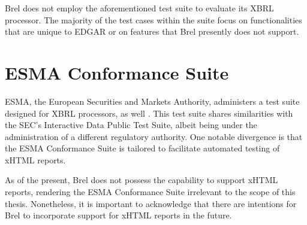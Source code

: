 Brel does not employ the aforementioned test suite to evaluate its XBRL processor.
The majority of the test cases within the suite focus on functionalities that are unique to EDGAR or on features that Brel presently does not support.

\section{ESMA Conformance Suite}

ESMA, the European Securities and Markets Authority, 
administers a test suite designed for XBRL processors, as well \cite{esma_conformance_suite}. 
This test suite shares similarities with the SEC's Interactive Data Public Test Suite, albeit being under the administration of a different regulatory authority. 
One notable divergence is that the ESMA Conformance Suite is tailored to facilitate automated testing of xHTML reports.

As of the present, Brel does not possess the capability to support xHTML reports, 
rendering the ESMA Conformance Suite irrelevant to the scope of this thesis. 
Nonetheless, it is important to acknowledge that there are intentions for Brel to incorporate support for xHTML reports in the future.
